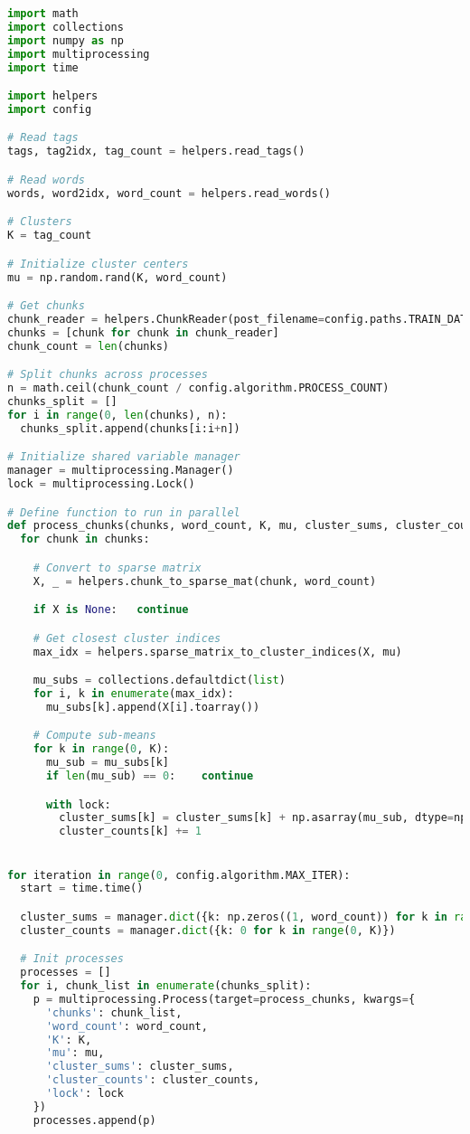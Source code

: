 \begin{lstlisting}[language=python]
import math
import collections
import numpy as np
import multiprocessing
import time

import helpers
import config

# Read tags
tags, tag2idx, tag_count = helpers.read_tags()

# Read words
words, word2idx, word_count = helpers.read_words()

# Clusters
K = tag_count

# Initialize cluster centers
mu = np.random.rand(K, word_count)

# Get chunks
chunk_reader = helpers.ChunkReader(post_filename=config.paths.TRAIN_DATA_IDX, chunk_size=config.data.CHUNK_SIZE) # TODO: Change
chunks = [chunk for chunk in chunk_reader]
chunk_count = len(chunks)

# Split chunks across processes
n = math.ceil(chunk_count / config.algorithm.PROCESS_COUNT)
chunks_split = []
for i in range(0, len(chunks), n):
  chunks_split.append(chunks[i:i+n])

# Initialize shared variable manager
manager = multiprocessing.Manager()
lock = multiprocessing.Lock()

# Define function to run in parallel
def process_chunks(chunks, word_count, K, mu, cluster_sums, cluster_counts, lock):
  for chunk in chunks:

    # Convert to sparse matrix
    X, _ = helpers.chunk_to_sparse_mat(chunk, word_count)

    if X is None:   continue

    # Get closest cluster indices
    max_idx = helpers.sparse_matrix_to_cluster_indices(X, mu)

    mu_subs = collections.defaultdict(list)
    for i, k in enumerate(max_idx):
      mu_subs[k].append(X[i].toarray())

    # Compute sub-means
    for k in range(0, K):
      mu_sub = mu_subs[k]
      if len(mu_sub) == 0:    continue

      with lock:
        cluster_sums[k] = cluster_sums[k] + np.asarray(mu_sub, dtype=np.float32).mean(axis=0)
        cluster_counts[k] += 1


for iteration in range(0, config.algorithm.MAX_ITER):
  start = time.time()

  cluster_sums = manager.dict({k: np.zeros((1, word_count)) for k in range(0, K)})
  cluster_counts = manager.dict({k: 0 for k in range(0, K)})

  # Init processes
  processes = []
  for i, chunk_list in enumerate(chunks_split):
    p = multiprocessing.Process(target=process_chunks, kwargs={
      'chunks': chunk_list,
      'word_count': word_count,
      'K': K,
      'mu': mu,
      'cluster_sums': cluster_sums,
      'cluster_counts': cluster_counts,
      'lock': lock
    })
    processes.append(p)


\end{lstlisting}

